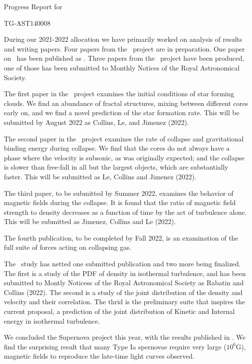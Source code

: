 \documentclass[11pt]{NSF}  %
\begin{document}
\begin{centering}
\begin{LARGE}
Progress Report for

TG-AST140008

\end{LARGE}
\end{centering}


\pagestyle{plain}

During our 2021-2022 allocation we have primarily worked on analysis of results and writing papers.
Four papers
from the \nameCores\ project are in preparation.
One paper on \nameSupernova\ has been published as \citep{Hristov21}.
Three papers from the
\nameTurbulence\ project have been produced, one of those has been submitted to Monthly
Notices of the Royal Astronomical Society.

The first paper in the \nameCores\ project examines the initial conditions 
of star forming clouds.  We find an abundance of fractal structures, mixing
between different cores early on, and we find a novel prediction of the star
formation rate.  This will be submitted by August 2022 as Collins, Le, and
Jimenez (2022).

The second paper in the \nameCores\ project examines the rate of collapse and
gravitational binding energy during collapse.
  We find that the cores do not always have a
phase where the velocity is subsonic, as was originally expected; and the
collapse is slower than free-fall in all but the largest objects, which are
substantially faster.  This will be submitted as Le, Collins and Jimenez (2022).

The third paper, to be submitted by Summer 2022,
examines the behavior of magnetic fields during the collapse.   It is found that
the ratio of magnetic field strength to density decreases as a function of time
by the act of turbulence alone.  This will be submitted as Jimenez, Collins and
Le (2022).

The fourth publication, to be completed by Fall 2022, is an examination of the
full suite of forces acting on collapsing gas.  

The \nameTurbulence\ study has netted one submitted publication and two more
being finalized.  The first is a study of the PDF of density in isothermal
turbulence, and has been submitted to Montly Noticess of the Royal Astronomical
Society as Rabatin and Collins (2022).  The second is
a study of the joint distribution of the density and velocity and their
correlation.  The thrid is the preliminary suite that inspires the current
proposal, a prediction of the joint distribution of Kinetic and Internal energy
in isothermal turbulence.  


We concluded the Supernova project this year, with the results published
in \citep{Hristov21}.  We find the surprising result that many Type Ia spernovae
require very large ($10^6$G), magnetic fields to reproduce the late-time light
curves observed.  


\end{document}
